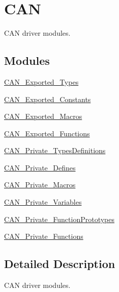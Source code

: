 \hypertarget{group___c_a_n}{}\section{C\+AN}
\label{group___c_a_n}


C\+AN driver modules.  


\subsection*{Modules}
\begin{DoxyCompactItemize}
\item 
\mbox{\hyperlink{group___c_a_n___exported___types}{C\+A\+N\+\_\+\+Exported\+\_\+\+Types}}
\item 
\mbox{\hyperlink{group___c_a_n___exported___constants}{C\+A\+N\+\_\+\+Exported\+\_\+\+Constants}}
\item 
\mbox{\hyperlink{group___c_a_n___exported___macros}{C\+A\+N\+\_\+\+Exported\+\_\+\+Macros}}
\item 
\mbox{\hyperlink{group___c_a_n___exported___functions}{C\+A\+N\+\_\+\+Exported\+\_\+\+Functions}}
\item 
\mbox{\hyperlink{group___c_a_n___private___types_definitions}{C\+A\+N\+\_\+\+Private\+\_\+\+Types\+Definitions}}
\item 
\mbox{\hyperlink{group___c_a_n___private___defines}{C\+A\+N\+\_\+\+Private\+\_\+\+Defines}}
\item 
\mbox{\hyperlink{group___c_a_n___private___macros}{C\+A\+N\+\_\+\+Private\+\_\+\+Macros}}
\item 
\mbox{\hyperlink{group___c_a_n___private___variables}{C\+A\+N\+\_\+\+Private\+\_\+\+Variables}}
\item 
\mbox{\hyperlink{group___c_a_n___private___function_prototypes}{C\+A\+N\+\_\+\+Private\+\_\+\+Function\+Prototypes}}
\item 
\mbox{\hyperlink{group___c_a_n___private___functions}{C\+A\+N\+\_\+\+Private\+\_\+\+Functions}}
\end{DoxyCompactItemize}


\subsection{Detailed Description}
C\+AN driver modules. 


